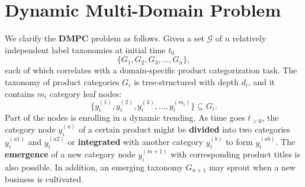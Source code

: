 \section{Dynamic Multi-Domain Problem}
We clarify the $\mathbf{DMPC}$ problem as follows. Given a set $\mathcal{G}$ of $n$ relatively independent label taxonomies at initial time $t_0$
$$
\{G_1, G_2, G_3, ..., G_n\},
$$
each of which correlates with a domain-specific product categorization task. The taxonomy of product categories $G_i$ is tree-structured with depth $d_i$, and it contains $m_i$ category leaf nodes:
$$
\{y_i^{(1)}, y_i^{(2)}, y_i^{(3)}, ..., y_i^{(m_i)}\} \subseteq G_i.
$$
Part of the nodes is enrolling in a dynamic trending. As time goes $t_{>0}$, the category node $y_i^{(a)}$ of a certain product might be \textbf{divided} into two categories $y_i^{(a1)}$ and $y_i^{(a2)}$ or \textbf{integrated} with another category $y_i^{(b)}$ to form $y_i^{(ab)}$. The \textbf{emergence} of a new category node $y_i^{(m+1)}$ with corresponding product titles is also possible.
In addition, an emerging taxonomy $G_{n+1}$ may sprout when a new business is cultivated.


